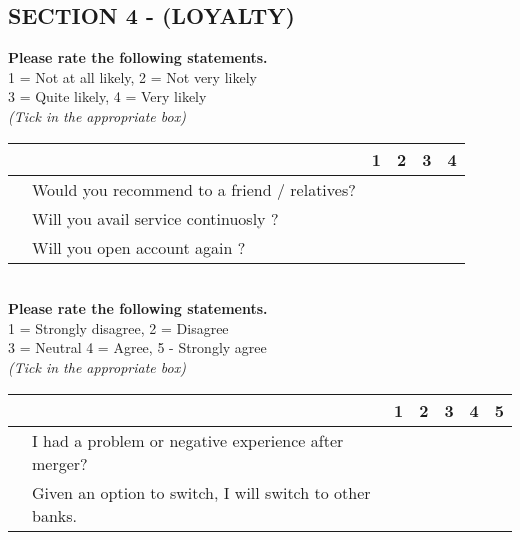 \documentclass[12pt,a4paper]{extarticle}
\newcounter{magicrownumbers}
\newcommand\rownumber{\stepcounter{magicrownumbers}\arabic{magicrownumbers}}
\newcommand \tab[1][1cm]{\hspace*{#1}}
\begin{document}
{\subsection*{SECTION 4 - (LOYALTY)}
\textbf{Please rate the following statements.}\\
1 = Not at all likely, 2 = Not very likely \\
3 = Quite likely, 4 = Very likely\\
\emph {(Tick in the appropriate box)}\\
\begin{minipage}{\textwidth}

\begin{tabularx}{\linewidth}{|l|l|X|X|X|X|}
\hline \multicolumn{2}{|c|}{} & 1 & 2 & 3 & 4\\
\hline \rownumber & Would you recommend to a friend / relatives? & \tab & \tab & \tab & \tab \\
\hline \rownumber & Will you avail service continuosly ?& \tab & \tab & \tab & \tab \\
\hline \rownumber & Will you open account again ? & \tab & \tab & \tab & \tab \\
\hline
\end{tabularx}

\end{minipage}
\tab \\
\textbf{Please rate the following statements.}\\
1 = Strongly disagree, 2 = Disagree \\
3 = Neutral
4 = Agree, 5 - Strongly agree\\
\emph {(Tick in the appropriate box)}\\
\begin{minipage}{\textwidth}

\begin{tabularx}{\linewidth}{|l|l|X|X|X|X|X|}
\hline \multicolumn{2}{|c|}{} & 1 & 2 & 3 & 4 & 5\\
\hline \rownumber & I had a problem or negative experience after merger? & \tab & \tab & \tab & \tab & \tab \\
\hline \rownumber & Given an option to switch, I will switch to other banks. & \tab & \tab & \tab & \tab & \tab \\
\hline
\end{tabularx}

\end{minipage}
}
\end{document}
